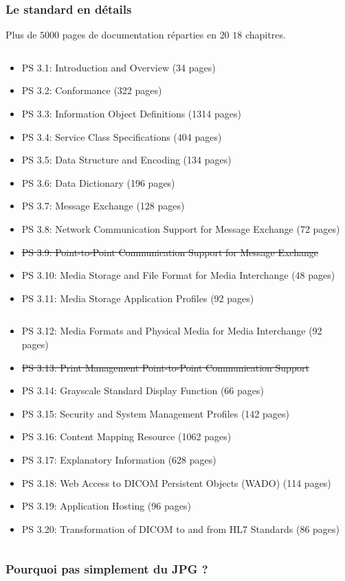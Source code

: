 	\frame
	{
		\frametitle{Le standard en d\'etails}
		Plus de $5000$ pages de documentation r\'eparties en \st{$20$} $18$ chapitres.
		
		\begin{columns}\begin{scriptsize}
	  	\begin{column}[t]{0.5\linewidth}
			\begin{itemize}
				\item PS 3.1: Introduction and Overview (34 pages)
				\item PS 3.2: Conformance (322 pages)
				\item PS 3.3: Information Object Definitions (1314 pages)
				\item PS 3.4: Service Class Specifications (404 pages)
				\item PS 3.5: Data Structure and Encoding (134 pages)
				\item PS 3.6: Data Dictionary (196 pages)
				\item PS 3.7: Message Exchange (128 pages)
				\item PS 3.8: Network Communication Support for Message Exchange (72 pages)
				\item \st{PS 3.9: Point-to-Point Communication Support for Message Exchange}
				\item PS 3.10: Media Storage and File Format for Media Interchange (48 pages)
				\item PS 3.11: Media Storage Application Profiles (92 pages)
			\end{itemize}
	  	\end{column}
	  	\begin{column}[t]{0.5\linewidth}
			\begin{itemize}
				\item PS 3.12: Media Formats and Physical Media for Media Interchange (92 pages)
				\item \st{PS 3.13: Print Management Point-to-Point Communication Support}
				\item PS 3.14: Grayscale Standard Display Function (66 pages)
				\item PS 3.15: Security and System Management Profiles (142 pages)
				\item PS 3.16: Content Mapping Resource (1062 pages)
				\item PS 3.17: Explanatory Information (628 pages)
				\item PS 3.18: Web Access to DICOM Persistent Objects (WADO) (114 pages)
				\item PS 3.19: Application Hosting (96 pages)
				\item PS 3.20: Transformation of DICOM to and from HL7 Standards (86 pages)
			\end{itemize}
	  	\end{column}\end{scriptsize}
	  	\end{columns}
	}

	\frame
	{
		\frametitle{Pourquoi pas simplement du JPG ?}
		
		
	}